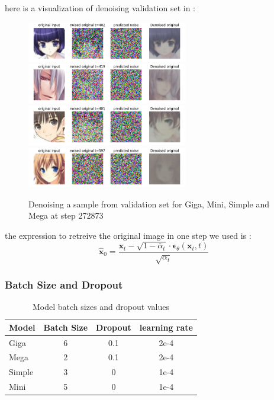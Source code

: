 \documentclass[twocolumn,superscriptaddress,aps]{revtex4-1}
\begin{document}
here is a visualization of denoising validation set in :
    \begin{figure}[H]
	\centering
	\includegraphics[width=7cm]{figures/media_images_Denoising a sample from validation set_272873_8f570bf75838a8c0f961.png}
    \includegraphics[width=7cm]{figures/media_images_Denoising a sample from validation set_226965_d51d5491ec7767a5c8d0.png}
    \includegraphics[width=7cm]{figures/media_images_Denoising a sample from validation set_282472_8098099f38ef93fd45ec.png}
    \includegraphics[width=7cm]{figures/media_images_Denoising a sample from validation set_127081_6463e0d9c857dd554363.png}
	\caption{Denoising a sample from validation set for Giga, Mini, Simple and Mega  at step 272873}
	\label{fig:denoising_validation_set}
\end{figure}
the expression to retreive the original image in one step we used is :
$$
 \hat{\mathbf{x}}_0 = \frac{\mathbf{x}_t - \sqrt{1 - \bar{\alpha}_t} \cdot \boldsymbol{\epsilon}_\theta(\mathbf{x}_t, t)}{\sqrt{\alpha_t}}
$$

\subsubsection{Batch Size and Dropout}
\begin{table}[h]
	\centering
	\begin{tabular}{lccc}
		\hline
		Model  & Batch Size & Dropout & learning rate \\
		\hline
		Giga   & 6          & 0.1     & 2e-4          \\
		Mega   & 2          & 0.1     & 2e-4          \\
		Simple & 3          & 0       & 1e-4          \\
		Mini   & 5          & 0       & 1e-4          \\
		\hline
	\end{tabular}
	\caption{Model batch sizes and dropout values}
\end{table}
\end{document}
